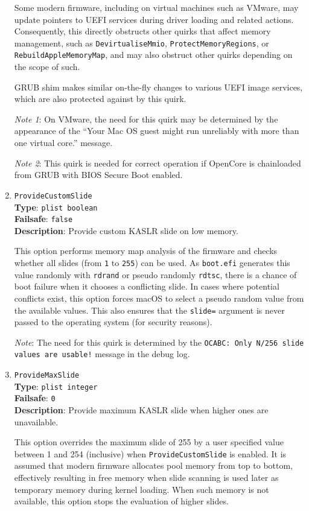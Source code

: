\documentclass[]{article}
\begin{document}
\begin{enumerate}
  Some modern firmware, including on virtual machines such as VMware,
  may update pointers to UEFI services during driver loading and related actions.
  Consequently, this directly obstructs other quirks that affect memory management,
  such as \texttt{DevirtualiseMmio}, \texttt{ProtectMemoryRegions}, or \texttt{RebuildAppleMemoryMap},
  and may also obstruct other quirks depending on the scope of such.

  GRUB shim makes similar on-the-fly changes to various UEFI image services,
  which are also protected against by this quirk.

  \emph{Note 1}: On VMware, the need for this quirk may be determined by the appearance of the
  ``Your Mac OS guest might run unreliably with more than one virtual core.'' message.

  \emph{Note 2}: This quirk is needed for correct operation if OpenCore is chainloaded from GRUB
  with BIOS Secure Boot enabled.

\item
  \texttt{ProvideCustomSlide}\\
  \textbf{Type}: \texttt{plist\ boolean}\\
  \textbf{Failsafe}: \texttt{false}\\
  \textbf{Description}: Provide custom KASLR slide on low memory.

  This option performs memory map analysis of the firmware and checks whether
  all slides (from \texttt{1} to \texttt{255}) can be used. As \texttt{boot.efi}
  generates this value randomly with \texttt{rdrand} or pseudo randomly \texttt{rdtsc},
  there is a chance of boot failure when it chooses a conflicting slide. In cases where
  potential conflicts exist, this option forces macOS to select a pseudo random value
  from the available values. This also ensures that the \texttt{slide=} argument is
  never passed to the operating system (for security reasons).

  \emph{Note}: The need for this quirk is determined by the \texttt{OCABC: Only N/256
  slide values are usable!} message in the debug log.

\item
  \texttt{ProvideMaxSlide}\\
  \textbf{Type}: \texttt{plist\ integer}\\
  \textbf{Failsafe}: \texttt{0}\\
  \textbf{Description}: Provide maximum KASLR slide when higher ones are unavailable.

  This option overrides the maximum slide of 255 by a user specified value between 1 and 254
  (inclusive) when \texttt{ProvideCustomSlide} is enabled. It is assumed that modern firmware
  allocates pool memory from top to bottom, effectively resulting in free memory when slide
  scanning is used later as temporary memory during kernel loading. When such memory is not
  available, this option stops the evaluation of higher slides.


\end{enumerate}
\end{document}
